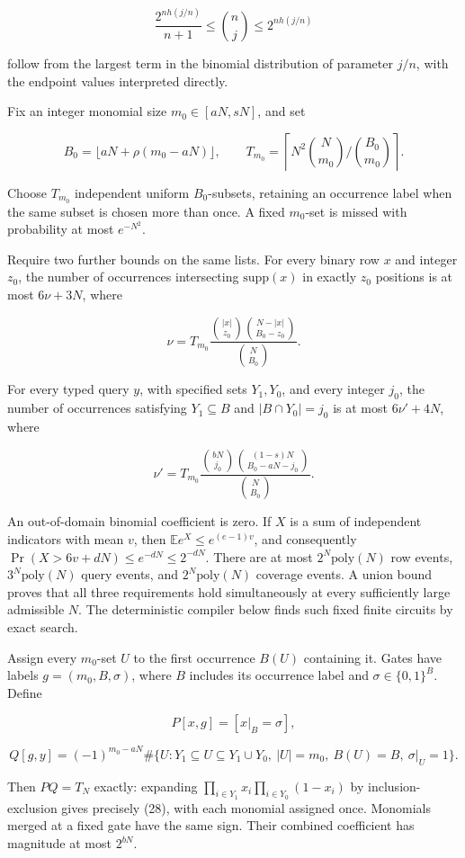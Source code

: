 \[
\frac{2^{n h(j/n)}}{n+1}\le\binom nj\le2^{n h(j/n)}
\tag{25}
\]

follow from the largest term in the binomial distribution of parameter \(j/n\), with the endpoint values interpreted directly.

Fix an integer monomial size \(m_0\in[aN,sN]\), and set

\[
B_0=\lfloor aN+\rho(m_0-aN)\rfloor,\qquad
T_{m_0}=\left\lceil N^2\binom N{m_0}/\binom{B_0}{m_0}\right\rceil.
\]

Choose \(T_{m_0}\) independent uniform \(B_0\)-subsets, retaining an occurrence label when the same subset is chosen more than once. A fixed \(m_0\)-set is missed with probability at most \(e^{-N^2}\).

Require two further bounds on the same lists. For every binary row \(x\) and integer \(z_0\), the number of occurrences intersecting \(\mathrm{supp}(x)\) in exactly \(z_0\) positions is at most \(6\nu+3N\), where

\[
\nu=T_{m_0}\frac{\binom{|x|}{z_0}\binom{N-|x|}{B_0-z_0}}
 {\binom N{B_0}}.
\tag{26}
\]

For every typed query \(y\), with specified sets \(Y_1,Y_0\), and every integer \(j_0\), the number of occurrences satisfying \(Y_1\subseteq B\) and \(|B\cap Y_0|=j_0\) is at most \(6\nu'+4N\), where

\[
\nu'=T_{m_0}
 \frac{\binom{bN}{j_0}\binom{(1-s)N}{B_0-aN-j_0}}
 {\binom N{B_0}}.
\tag{27}
\]

An out-of-domain binomial coefficient is zero. If \(X\) is a sum of independent indicators with mean \(v\), then \(\mathbb E e^X\le e^{(e-1)v}\), and consequently \(\Pr(X>6v+dN)\le e^{-dN}\le2^{-dN}\). There are at most \(2^N\mathrm{poly}(N)\) row events, \(3^N\mathrm{poly}(N)\) query events, and \(2^N\mathrm{poly}(N)\) coverage events. A union bound proves that all three requirements hold simultaneously at every sufficiently large admissible \(N\). The deterministic compiler below finds such fixed finite circuits by exact search.

Assign every \(m_0\)-set \(U\) to the first occurrence \(B(U)\) containing it. Gates have labels \(g=(m_0,B,\sigma)\), where \(B\) includes its occurrence label and \(\sigma\in\{0,1\}^{B}\). Define

\[
P[x,g]=[x|_B=\sigma],
\]

\[
Q[g,y]=(-1)^{m_0-aN}
 \#\{U:Y_1\subseteq U\subseteq Y_1\cup Y_0,\ |U|=m_0,
                \ B(U)=B,\ \sigma|_U=1\}.
\tag{28}
\]

Then \(PQ=T_N\) exactly: expanding \(\prod_{i\in Y_1}x_i\prod_{i\in Y_0}(1-x_i)\) by inclusion-exclusion gives precisely (28), with each monomial assigned once. Monomials merged at a fixed gate have the same sign. Their combined coefficient has magnitude at most \(2^{bN}\).

